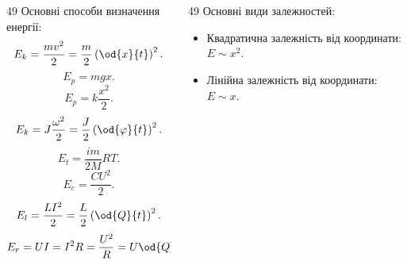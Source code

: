 \documentclass[14pt,handout,utf8]{beamer}
\newlength\TW
\newcommand{\Xhead}[1]{
 \begin{center}%
      \textbf{#1}%
 \end{center}%
}
\begin{document}
\begin{frame}
  \frametitle{~}

  \begin{columns}
    \begin{column}{49\TW}
      Основні способи визначення енергії:
      \begin{equation}
        E_k = \frac{mv^2}{2} = \frac{m}{2} \left( \od{x}{t} \right)^2.
        \label{atu:eq:Ek_v}
      \end{equation}
      \begin{equation}
        E_p = m g x .
        \label{atu:eq:Ep_g}
      \end{equation}
      \begin{equation}
        E_p = k \frac{x^2}{2} .
        \label{atu:eq:Ep_spring}
      \end{equation}
      \begin{equation}
        E_k = J \frac{\omega^2}{2} = \frac{J}{2} \left( \od{\varphi}{t} \right)^2 .
        \label{atu:eq:Ek_spin}
      \end{equation}
      \begin{equation}
        E_t = \frac{im}{2M} RT.
        \label{atu:eq:Et}
      \end{equation}
      \begin{equation}
        E_c = \frac{C U^2}{2}.
        \label{atu:eq:Ec}
      \end{equation}
      \begin{equation}
        E_l = \frac{L I^2}{2} = \frac{L}{2} \left( \od{Q}{t}\right)^2 .
        \label{atu:eq:El}
      \end{equation}
      \begin{equation}
        E_r = U I = I^2 R = \frac{U^2}{R} = U \od{Q}{t} .
        \label{atu:eq:Er}
      \end{equation}

    \end{column}
    \begin{column}{49\TW}
      Основні види залежностей:

      \begin{itemize}

        \item
          Квадратична залежність від координати:
          $E \sim x^2$.

        \item
          Лінійна залежність від координати:
          $E \sim x$.


\end{itemize}
\end{column}
\end{columns}
\end{frame}
\end{document}
